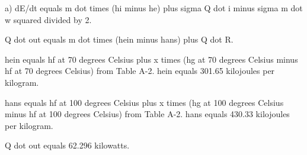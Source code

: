 a)  
dE/dt equals m dot times (hi minus he) plus sigma Q dot i minus sigma m dot w squared divided by 2.  

Q dot out equals m dot times (hein minus hans) plus Q dot R.  

hein equals hf at 70 degrees Celsius plus x times (hg at 70 degrees Celsius minus hf at 70 degrees Celsius) from Table A-2.  
hein equals 301.65 kilojoules per kilogram.  

hans equals hf at 100 degrees Celsius plus x times (hg at 100 degrees Celsius minus hf at 100 degrees Celsius) from Table A-2.  
hans equals 430.33 kilojoules per kilogram.  

Q dot out equals 62.296 kilowatts.